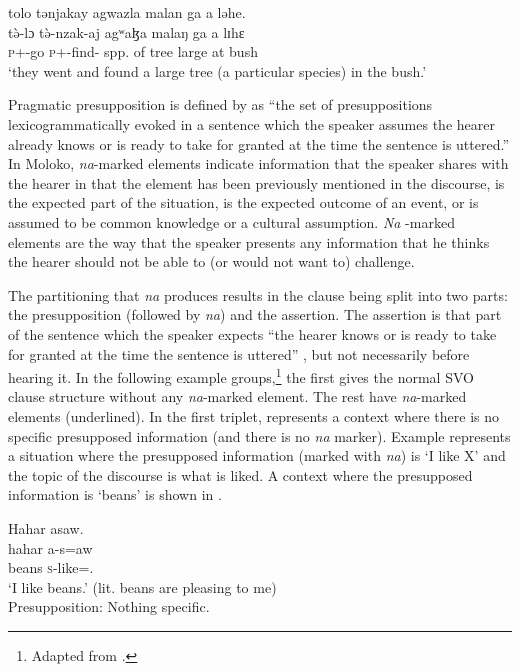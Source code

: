       \medskip
tolo  tənjakay  agwazla  malan  ga  a  ləhe.\\      
\gll t\`{ə}-lɔ t\`{ə}-nzak-aj agʷaɮa malaŋ ga a lɪhɛ\\
     \textsc{p}+{\PFV}-go \textsc{p}+{\PFV}-find{}-{\CL} {spp. of tree}  large {\ADJ} at bush\\
\glt  ‘they went and found a large tree (a particular species) in the bush.’
\z

Pragmatic presupposition is defined by \citet[52]{Lambrecht1994} as “the set of presuppositions lexicogrammatically evoked in a sentence which the speaker assumes the hearer already knows or is ready to take for granted at the time the sentence is uttered.”  In Moloko, \textit{na}{}-marked elements indicate information that the speaker shares with the hearer in that the element has been previously mentioned in the discourse, is the expected part of the situation, is the expected outcome of an event, or is assumed to be common knowledge or a cultural assumption. \textit{Na} -marked elements are the way that the speaker presents any information that he thinks the hearer should not be able to (or would not want to) challenge. 

\largerpage
The partitioning that \textit{na} produces results in the clause being split into two parts:  the presupposition (followed by \textit{na}) and the assertion. The assertion is that part of the sentence which the speaker expects “the hearer knows or is ready to take for granted at the time the sentence is uttered” \citep[52]{Lambrecht1994}, but not necessarily before hearing it.  In the following example groups,\footnote{Adapted from \citealt{Boyd2002}.} the first gives the normal SVO clause structure without any \textit{na}{}-marked element. The rest have \textit{na}-marked elements (underlined). In the first triplet,  represents a context where there is no specific presupposed information (and there is no \textit{na} marker). Example  represents a situation where the presupposed information (marked with  \textit{na}) is ‘I like X’ and the topic of the discourse is what is liked. A context where the presupposed information is ‘beans’ is shown in .

\ea \label{ex:11:5}
Hahar  asaw. \\
\gll  hahar   a-s=aw \\
      beans   \textsc{s}-like={\oneS}.{\IO}\\
\glt  ‘I like beans.’ (lit. beans are pleasing to me) \\
  Presupposition:     Nothing specific.
\z


